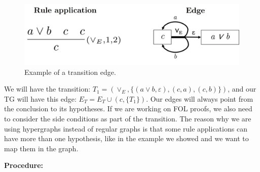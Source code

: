     \begin{figure}
        \centering
        \includegraphics[width=0.8\linewidth]{resources/te-example.jpg}
        \caption{Example of a transition edge.}
        \label{fig:te-ex}
    \end{figure}

We will have the transition: \(T_1 = (\vee_E, \{(a \vee b, \varepsilon), (c, a), (c, b)\})\), and our TG will have this edge: \(E_T = E_T \cup (c, \{T_1\})\). Our edges will always point from the conclusion to its hypotheses. If we are working on FOL proofs, we also need to consider the side conditions as part of the transition. The reason why we are using hypergraphs instead of regular graphs is that some rule applications can have more than one hypothesis, like in the example we showed and we want to map them in the graph.

\vspace{1em}
\textbf{Procedure: }

